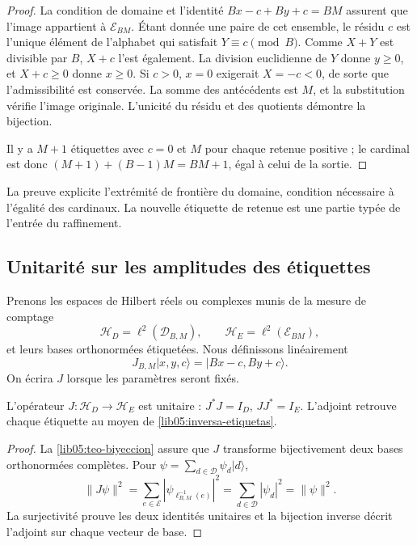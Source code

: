 \begin{proof}
La condition de domaine et l'identité \(Bx-c+By+c=BM\) assurent que l'image appartient à \(\mathcal E_{BM}\). Étant donnée une paire de cet ensemble, le résidu \(c\) est l'unique élément de l'alphabet qui satisfait \(Y\equiv c\pmod B\). Comme \(X+Y\) est divisible par \(B\), \(X+c\) l'est également. La division euclidienne de \(Y\) donne \(y\geq0\), et \(X+c\geq0\) donne \(x\geq0\). Si \(c>0\), \(x=0\) exigerait \(X=-c<0\), de sorte que l'admissibilité est conservée. La somme des antécédents est \(M\), et la substitution vérifie l'image originale. L'unicité du résidu et des quotients démontre la bijection.

Il y a \(M+1\) étiquettes avec \(c=0\) et \(M\) pour chaque retenue
positive ; le cardinal est donc
\((M+1)+(B-1)M=BM+1\), égal à celui de la sortie.
\end{proof}

La preuve explicite l’extrémité de frontière du domaine, condition
nécessaire à l’égalité des cardinaux. La nouvelle étiquette de retenue
est une partie typée de l’entrée du raffinement.

\subsection{Unitarité sur les amplitudes des étiquettes}
\label{lib05:unitariedad}

Prenons les espaces de Hilbert réels ou complexes munis de la mesure de comptage
\begin{equation}
 \mathscr H_D=\ell^2(\mathcal D_{B,M}),\qquad
 \mathscr H_E=\ell^2(\mathcal E_{BM}),
 \label{lib05:hilbert}
\end{equation}
et leurs bases orthonormées étiquetées. Nous définissons linéairement
\begin{equation}
 J_{B,M}|x,y,c\rangle=|Bx-c,By+c\rangle.
 \label{lib05:j}
\end{equation}
On écrira \(J\) lorsque les paramètres seront fixés.

\begin{proposition}
\label{lib05:prop-unitaria}
L’opérateur \(J:\mathscr H_D\to\mathscr H_E\) est unitaire :
\(J^*J=I_D\), \(JJ^*=I_E\). L’adjoint retrouve chaque étiquette
au moyen de \eqref{lib05:inversa-etiquetas}.
\end{proposition}

\begin{proof}
La \cref{lib05:teo-biyeccion} assure que \(J\) transforme
bijectivement deux bases orthonormées complètes. Pour
\(\psi=\sum_{d\in\mathcal D}\psi_d|d\rangle\),
\[
 \|J\psi\|^2
 =\sum_{e\in\mathcal E}|\psi_{\ell_{B,M}^{-1}(e)}|^2
 =\sum_{d\in\mathcal D}|\psi_d|^2=\|\psi\|^2.
\]
La surjectivité prouve les deux identités unitaires et la
bijection inverse décrit l’adjoint sur chaque vecteur de base.
\end{proof}

